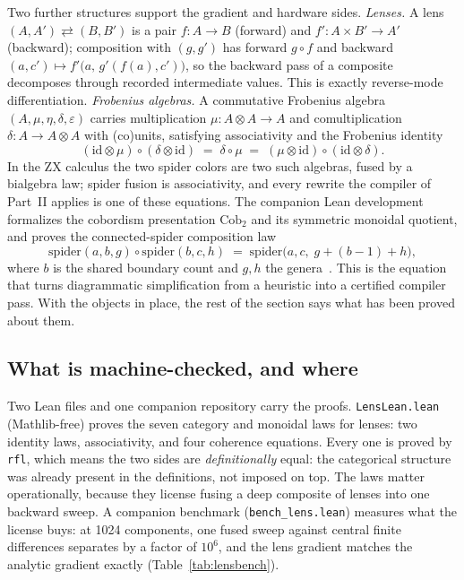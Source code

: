 Two further structures support the gradient and hardware sides. \emph{Lenses.} A lens $(A,A')\rightleftarrows(B,B')$ is a pair $f\colon A\to B$ (forward) and $f'\colon A\times B'\to A'$ (backward); composition with $(g,g')$ has forward $g\circ f$ and backward $(a,c')\mapsto f'\bigl(a,\,g'(f(a),c')\bigr)$, so the backward pass of a composite decomposes through recorded intermediate values. This is exactly reverse-mode differentiation. \emph{Frobenius algebras.} A commutative Frobenius algebra $(A,\mu,\eta,\delta,\varepsilon)$ carries multiplication $\mu\colon A\otimes A\to A$ and comultiplication $\delta\colon A\to A\otimes A$ with (co)units, satisfying associativity and the Frobenius identity
\begin{equation}\label{eq:frob}
(\mathrm{id}\otimes\mu)\circ(\delta\otimes\mathrm{id}) \;=\; \delta\circ\mu \;=\; (\mu\otimes\mathrm{id})\circ(\mathrm{id}\otimes\delta).
\end{equation}
In the ZX calculus the two spider colors are two such algebras, fused by a bialgebra law; spider fusion is associativity, and every rewrite the compiler of Part~II applies is one of these equations. The companion Lean development formalizes the cobordism presentation $\mathrm{Cob}_2$ and its symmetric monoidal quotient, and proves the connected-spider composition law
\begin{equation}\label{eq:spider}
\mathrm{spider}(a,b,g)\circ \mathrm{spider}(b,c,h) \;=\; \mathrm{spider}\bigl(a,c,\; g+(b-1)+h\bigr),
\end{equation}
where $b$ is the shared boundary count and $g,h$ the genera~\cite{liquidtqft2026}. This is the equation that turns diagrammatic simplification from a heuristic into a certified compiler pass. With the objects in place, the rest of the section says what has been proved about them.

\subsection{What is machine-checked, and where}

Two Lean files and one companion repository carry the proofs. \texttt{LensLean.lean} (Mathlib-free) proves the seven category and monoidal laws for lenses: two identity laws, associativity, and four coherence equations. Every one is proved by \texttt{rfl}, which means the two sides are \emph{definitionally} equal: the categorical structure was already present in the definitions, not imposed on top. The laws matter operationally, because they license fusing a deep composite of lenses into one backward sweep. A companion benchmark (\texttt{bench\_lens.lean}) measures what the license buys: at 1024 components, one fused sweep against central finite differences separates by a factor of $10^6$, and the lens gradient matches the analytic gradient exactly (Table~\ref{tab:lensbench}).

